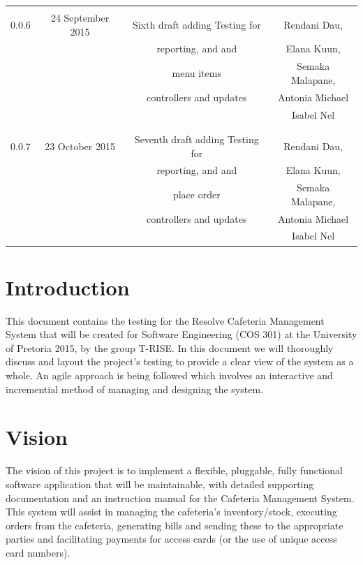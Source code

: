 \documentclass[a4paper,12pt]{report}
\begin{document}
\begin{table}[h!]
\begin{tabular}{||c c c c||}
& & & \\
 \hline 
 & & & \\
 0.0.6 & 24 September 2015 &  Sixth draft adding Testing for  & Rendani Dau, \\ & & reporting, and and & Elana Kuun, \\ & & menu items & Semaka Malapane, \\ & & controllers and updates &  Antonia Michael \\ & & & Isabel Nel \\   [1ex] 
& & & \\
 \hline 
 & & & \\
 0.0.7 & 23 October 2015 &  Seventh draft adding Testing for  & Rendani Dau, \\ & & reporting, and and & Elana Kuun, \\ & & place order & Semaka Malapane, \\ & & controllers and updates &  Antonia Michael \\ & & & Isabel Nel \\   [1ex] 
 \hline
 \end{tabular}
\end{table} 

\pagebreak
\section{Introduction}
This document contains the   testing for the Resolve Cafeteria Management System that will be created for Software Engineering (COS 301) at the University of Pretoria 2015, by the group T-RISE. In this document we will thoroughly discuss and layout the project's testing to provide a clear view of the system as a whole. An agile approach is being followed which involves an interactive and incremential method of managing and designing the system. 

\section{Vision}
The vision of this project is to implement a flexible, pluggable, fully functional software application that will be maintainable, with detailed supporting documentation and an instruction manual for the Cafeteria Management System. This system will assist in managing the cafeteria's inventory/stock, executing orders from the cafeteria, generating bills and sending these to the appropriate parties and facilitating payments for access cards (or the use of unique access card numbers). 
\end{document}
